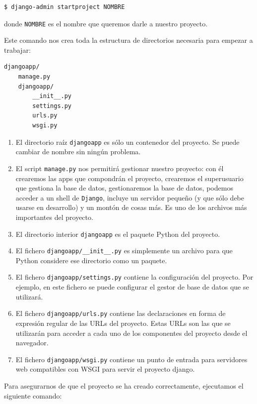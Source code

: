\begin{verbatim}
$ django-admin startproject NOMBRE
\end{verbatim}

donde \texttt{NOMBRE} es el nombre que queremos darle a nuestro proyecto.

Este comando nos crea toda la estructura de directorios necesaria para empezar a trabajar:

\begin{verbatim}
djangoapp/
    manage.py
    djangoapp/
        __init__.py
        settings.py
        urls.py
        wsgi.py
\end{verbatim}

\begin{enumerate}[---]
	\item El directorio raíz \texttt{djangoapp} es sólo un contenedor del proyecto. Se puede cambiar de nombre sin ningún problema.
	\item El script \texttt{manage.py} nos permitirá gestionar nuestro proyecto: con él crearemos las apps que compondrán el proyecto, crearemos el superusuario que gestiona la base de datos, gestionaremos la base de datos, podemos acceder a un shell de \texttt{Django}, incluye un servidor pequeño (y que sólo debe usarse en desarrollo) y un montón de cosas más. Es uno de los archivos más importantes del proyecto.
	\item El directorio interior \texttt{djangoapp} es el paquete Python del proyecto.
	\item El fichero \texttt{djangoapp/\_\_init\_\_.py} es simplemente un archivo para que Python considere ese directorio como un paquete.
	\item El fichero \texttt{djangoapp/settings.py} contiene la configuración del proyecto. Por ejemplo, en este fichero se puede configurar el gestor de base de datos que se utilizará.
	\item El fichero \texttt{djangoapp/urls.py} contiene las declaraciones en forma de expresión regular de las URLs del proyecto. Estas URLs son las que se utilizarán para acceder a cada uno de los componentes del proyecto desde el navegador.
	\item El fichero \texttt{djangoapp/wsgi.py} contiene un punto de entrada para servidores web compatibles con WSGI para servir el proyecto django.
\end{enumerate}

Para asegurarnos de que el proyecto se ha creado correctamente, ejecutamos el siguiente comando:


